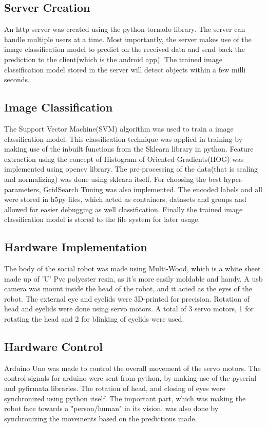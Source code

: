 \documentclass{fisatproject}
\begin{document}
\subsection{Server Creation}
An http server was created using the python-tornado library. The server can handle multiple users at a time. Most importantly, the server makes use of the image classification model to predict on the received data and send back the prediction to the client(which is the android app). The trained image classification model stored in the server will detect objects within a few milli seconds.
\subsection{Image Classification}
The Support Vector Machine(SVM) algorithm was used to train a image classification model. This classification technique was applied in training by making use of the inbuilt functions from the Sklearn library in python. Feature extraction using the concept of Histogram of Oriented Gradients(HOG) was implemented using opencv library. The pre-processing of the data(that is scaling and normalizing) was done using sklearn itself. For choosing the best hyper-parameters, GridSearch Tuning was also implemented. The encoded labels and all were stored in h5py files, which acted as containers, datasets and groups and allowed for easier debugging as well classification. Finally the trained image classification model is stored to the file system for later usage.
\subsection{Hardware Implementation}
The body of the social robot was made using Multi-Wood, which is a white sheet made up of 'U' Pvc polyester resin, as it's more easily moldable and handy. A usb camera was mount inside the head of the robot, and it acted as the eyes of the robot. The external eye and eyelids were 3D-printed for precision. Rotation of head and eyelids were done using servo motors. A total of 3 servo motors, 1 for rotating the head and 2 for blinking of eyelids were used.
\subsection{Hardware Control}
Arduino Uno was made to control the overall movement of the servo motors. The control signals for arduino were sent from python, by making use of the pyserial and pyfirmata libraries. The rotation of head, and closing of eyes were synchronized using python itself. The important part, which was making the robot face towards a "person/human" in its vision, was also done by synchronizing the movements based on the predictions made.
\newpage
\end{document}
